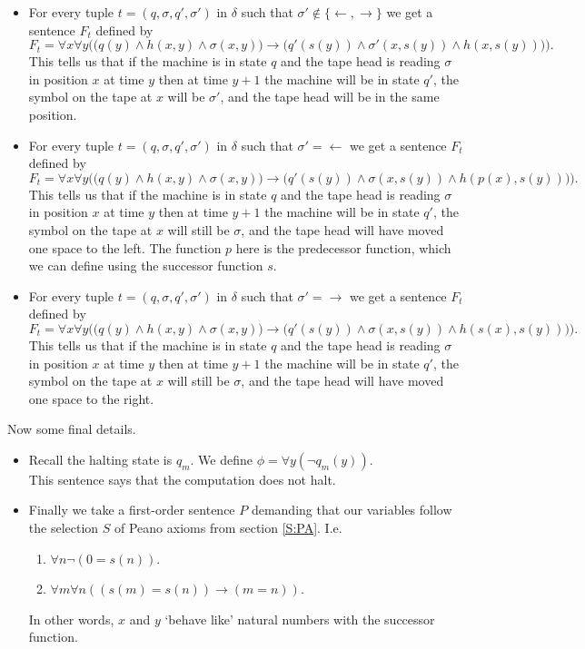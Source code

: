 \documentclass{article}
\theoremstyle{plain}
\theoremstyle{definition}
\newcommand{\ra}{\rightarrow}
\newcommand{\la}{\leftarrow}
\begin{document}
\begin{itemize}
\item For every tuple $t=(q,\sigma,q',\sigma')$ in $\delta$ such that $\sigma'\notin\{\la,\ra\}$ we get a sentence $F_t$ defined by
\begin{equation*}
F_t=\forall x\forall y\Big(\big(q(y)\wedge h(x,y)\wedge \sigma(x,y)\big)\ra \big(q'(s(y))\wedge \sigma'(x,s(y))\wedge h(x,s(y))\big) \Big).
\end{equation*}
This tells us that if the machine is in state $q$ and the tape head is reading $\sigma$ in position $x$ at time $y$ then at time $y+1$ the machine will be in state $q'$, the symbol on the tape at $x$ will be $\sigma'$, and the tape head will be in the same position.
\item For every tuple $t=(q,\sigma,q',\sigma')$ in $\delta$ such that $\sigma'=\la$ we get a sentence $F_t$ defined by 
\begin{equation*}
F_t=\forall x\forall y\Big(\big(q(y)\wedge h(x,y)\wedge \sigma(x,y)\big)\ra \big(q'(s(y))\wedge \sigma(x,s(y))\wedge h(p(x),s(y))\big) \Big).
\end{equation*}
This tells us that if the machine is in state $q$ and the tape head is reading $\sigma$ in position $x$ at time $y$ then at time $y+1$ the machine will be in state $q'$, the symbol on the tape at $x$ will still be $\sigma$, and the tape head will have moved one space to the left. The function $p$ here is the predecessor function, which we can define using the successor function $s$.
\item For every tuple $t=(q,\sigma,q',\sigma')$ in $\delta$ such that $\sigma'=\ra$ we get a sentence $F_t$ defined by 
\begin{equation*}
F_t=\forall x\forall y\Big(\big(q(y)\wedge h(x,y)\wedge \sigma(x,y)\big)\ra (q'(s(y))\wedge \sigma(x,s(y))\wedge h(s(x),s(y))\big) \Big).
\end{equation*}
This tells us that if the machine is in state $q$ and the tape head is reading $\sigma$ in position $x$ at time $y$ then at time $y+1$ the machine will be in state $q'$, the symbol on the tape at $x$ will still be $\sigma$, and the tape head will have moved one space to the right.
\end{itemize}

Now some final details.
\begin{itemize}
\item Recall the halting state is $q_m$. We define $\phi = \forall y (\neg q_m(y))$.\\
This sentence says that the computation does not halt.
\item Finally we take a first-order sentence $P$ demanding that our variables follow the selection $S$ of Peano axioms from section \ref{S:PA}. I.e.
\begin{enumerate}
\item $\forall n \neg (0 =s(n))$.
\item $\forall m\forall n((s(m)=s(n))\ra (m =n))$.
\end{enumerate}
In other words, $x$ and $y$ `behave like' natural numbers with the successor function.
\end{itemize}
\end{document}

